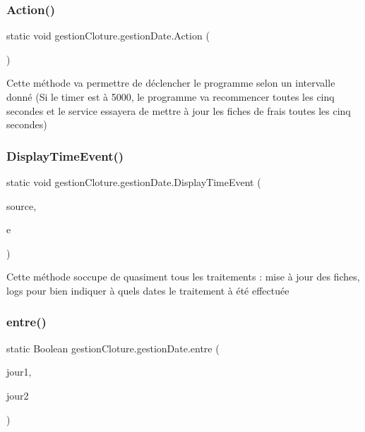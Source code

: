 \subsubsection{\texorpdfstring{Action()}{Action()}}
{\footnotesize\ttfamily static void gestion\+Cloture.\+gestion\+Date.\+Action (\begin{DoxyParamCaption}{ }\end{DoxyParamCaption})\hspace{0.3cm}{\ttfamily [static]}}

Cette méthode va permettre de déclencher le programme selon un intervalle donné (Si le timer est à 5000, le programme va recommencer toutes les cinq secondes et le service essayera de mettre à jour les fiches de frais toutes les cinq secondes) \mbox{\label{classgestion_cloture_1_1gestion_date_a6646013d65b640490269556de333607c}} 
\subsubsection{\texorpdfstring{Display\+Time\+Event()}{DisplayTimeEvent()}}
{\footnotesize\ttfamily static void gestion\+Cloture.\+gestion\+Date.\+Display\+Time\+Event (\begin{DoxyParamCaption}\item[{object}]{source,  }\item[{Elapsed\+Event\+Args}]{e }\end{DoxyParamCaption})\hspace{0.3cm}{\ttfamily [static]}}

Cette méthode s\textquotesingle{}occupe de quasiment tous les traitements \+: mise à jour des fiches, logs pour bien indiquer à quels dates le traitement à été effectuée \mbox{\label{classgestion_cloture_1_1gestion_date_a9ee14a2e60b68ffedad925b42a0ad090}} 
\subsubsection{\texorpdfstring{entre()}{entre()}\hspace{0.1cm}{\footnotesize\ttfamily [1/2]}}
{\footnotesize\ttfamily static Boolean gestion\+Cloture.\+gestion\+Date.\+entre (\begin{DoxyParamCaption}\item[{int}]{jour1,  }\item[{int}]{jour2 }\end{DoxyParamCaption})\hspace{0.3cm}{\ttfamily [static]}}



